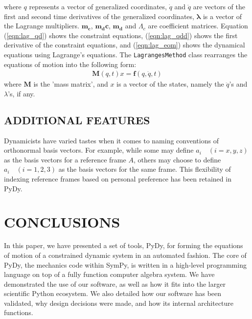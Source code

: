 \documentclass[twocolumn,10pt]{asme2e}
\begin{document}
where $q$ represents a vector of generalized coordinates, $\dot{q}$ and
$\ddot{q}$ are vectors of the first and second time derivatives of the
generalized coordinates, $\mathbf{\lambda}$ is a vector of the Lagrange
multipliers. $\mathbf{m_c}$, $\mathbf{m_dc}$, $\mathbf{m_d}$ and
$\Lambda_c$ are coefficient matrices.
Equation (\ref{eqn:lag_qd}) shows the constraint equations,
(\ref{eqn:lag_qdd}) shows the
first derivative of the constraint equations, and (\ref{eqn:lag_eom}) shows
the dynamical equations using Lagrange's equations. The
\verb|LagrangesMethod| class rearranges the equations of motion into the
following form:
\label{eqn:lag_rearr}
\begin{align}
    \mathbf{M}(q, t) x = \mathbf{f}(q, \dot{q}, t)
\end{align}
where $\mathbf{M}$ is the 'mass matrix', and $x$ is a vector of the states,
namely the $\ddot{q}$'s and $\lambda$'s, if any.

\subsection*{ADDITIONAL FEATURES}
Dynamicists have varied tastes when it comes to naming conventions of
orthonormal basis vectors. For example, while some may define $a_i
\quad (i=x,y,z)$ as the basis vectors for a reference frame $A$, others may
choose to define $a_i \quad (i=1,2,3)$ as the basis vectors for the same frame.
This flexibility of indexing reference frames based on personal preference has
been retained in PyDy.

%


\section*{CONCLUSIONS}
In this paper, we have presented a set of tools, PyDy, for forming the
equations of motion of a constrained dynamic system in an automated fashion.
The core of PyDy, the mechanics code within SymPy, is written in a high-level
programming language on top of a fully function computer algebra system.
We have demonstrated the use of our software, as well as how it fits into the
larger scientific Python ecosystem.
We also detailed how our software has been validated, why design decisions were
made, and how its internal architecture functions.
\end{document}
